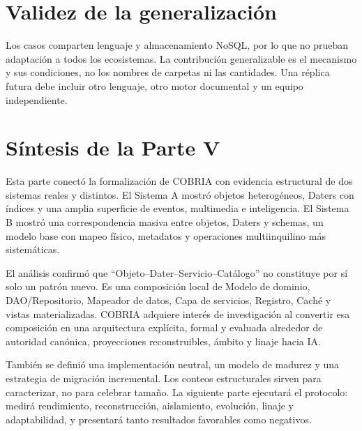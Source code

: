\section{Validez de la generalización}

Los casos comparten lenguaje y almacenamiento NoSQL, por lo que no prueban adaptación a
todos los ecosistemas. La contribución generalizable es el mecanismo y sus condiciones,
no los nombres de carpetas ni las cantidades. Una réplica futura debe incluir otro
lenguaje, otro motor documental y un equipo independiente.

\section{Síntesis de la Parte V}

Esta parte conectó la formalización de COBRIA con evidencia estructural de dos sistemas
reales y distintos. El Sistema A mostró objetos heterogéneos, Daters con índices y una
amplia superficie de eventos, multimedia e inteligencia. El Sistema B mostró una
correspondencia masiva entre objetos, Daters y schemas, un modelo base con mapeo físico,
metadatos y operaciones multiinquilino más sistemáticas.

El análisis confirmó que ``Objeto--Dater--Servicio--Catálogo'' no constituye por sí solo
un patrón nuevo. Es una composición local de Modelo de dominio, DAO/Repositorio, Mapeador de datos,
Capa de servicios, Registro, Caché y vistas materializadas. COBRIA adquiere interés de
investigación al convertir esa composición en una arquitectura explícita, formal y
evaluada alrededor de autoridad canónica, proyecciones reconstruibles, ámbito y linaje
hacia IA.

También se definió una implementación neutral, un modelo de madurez y una estrategia de
migración incremental. Los conteos estructurales sirven para caracterizar, no para
celebrar tamaño. La siguiente parte ejecutará el protocolo: medirá rendimiento,
reconstrucción, aislamiento, evolución, linaje y adaptabilidad, y presentará tanto
resultados favorables como negativos.

